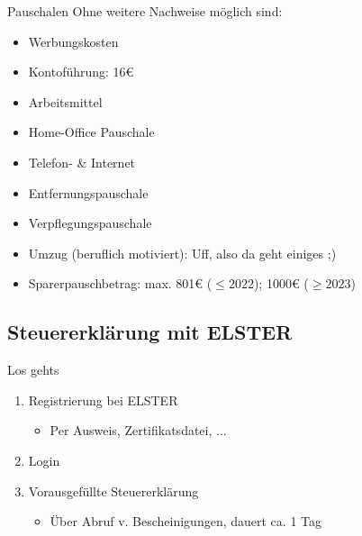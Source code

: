 \documentclass{beamer}
\begin{document}
			\begin{frame}{Pauschalen}
				Ohne weitere Nachweise möglich sind:
				\begin{itemize}
					\item Werbungskosten
					\item Kontoführung: 16€
					\pause
					\item Arbeitsmittel
					\item Home-Office Pauschale
					\item Telefon- \& Internet
					\pause
					\item Entfernungspauschale
					\item Verpflegungspauschale
					\pause
					\item Umzug (beruflich motiviert): Uff, also da geht einiges ;)
					\item Sparerpauschbetrag: max. 801€ ($\leq2022$); 1000€ ($\geq2023$)
				\end{itemize}
			\end{frame}
		
		\subsection{Steuererklärung mit ELSTER}
		
			\begin{frame}{Los gehts}
				\begin{enumerate}
					\item Registrierung bei ELSTER
					\begin{itemize}
						\item Per Ausweis, Zertifikatsdatei, ...
					\end{itemize}\pause
					\item Login\pause
					\item Vorausgefüllte Steuererklärung
					\begin{itemize}
						\item Über Abruf v. Bescheinigungen, dauert ca. 1 Tag
					\end{itemize}
				\end{enumerate}
			\end{frame}
		
\end{document}
